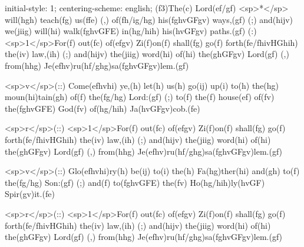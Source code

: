 initial-style: 1;
centering-scheme: english;
(f3)The(c) Lord(ef/gf) <sp>*</sp> will(hgh) teach(fg) us(ffe) (,) of(fh/ig/hg) his(fghvGFgv) ways,(gf) (;) and(hijv) we(jiig) will(hi) walk(fghvGFE) in(hg/hih) his(hvGFgv) paths.(gf) (:) <sp>1</sp>For(f) out(fc) of(efgv) Zi(f)on(f) shall(fg) go(f) forth(fe/fhivHGhih) the(iv) law,(ih) (;) and(hijv) the(jiig) word(hi) of(hi) the(ghGFgv) Lord(gf) (,) from(hhg) Je(efhv)ru(hf/ghg)sa(fghvGFgv)lem.(gf) 

<sp>v</sp>(::) Come(efhvhi) ye,(h) let(h) us(h) go(ij) up(i) to(h) the(hg) moun(hi)tain(gh) of(f) the(fg/hg) Lord:(gf) (;) to(f) the(f) house(ef) of(fv) the(fghvGFE) God(fv) of(hg/hih) Ja(hvGFgv)cob.(fe) 

<sp>r</sp>(::) <sp>1</sp>For(f) out(fc) of(efgv) Zi(f)on(f) shall(fg) go(f) forth(fe/fhivHGhih) the(iv) law,(ih) (;) and(hijv) the(jiig) word(hi) of(hi) the(ghGFgv) Lord(gf) (,) from(hhg) Je(efhv)ru(hf/ghg)sa(fghvGFgv)lem.(gf) 

<sp>v</sp>(::) Glo(efhvhi)ry(h) be(ij) to(i) the(h) Fa(hg)ther(hi) and(gh) to(f) the(fg/hg) Son:(gf) (;) and(f) to(fghvGFE) the(fv) Ho(hg/hih)ly(hvGF) Spir(gv)it.(fe)

<sp>r</sp>(::) <sp>1</sp>For(f) out(fc) of(efgv) Zi(f)on(f) shall(fg) go(f) forth(fe/fhivHGhih) the(iv) law,(ih) (;) and(hijv) the(jiig) word(hi) of(hi) the(ghGFgv) Lord(gf) (,) from(hhg) Je(efhv)ru(hf/ghg)sa(fghvGFgv)lem.(gf) 